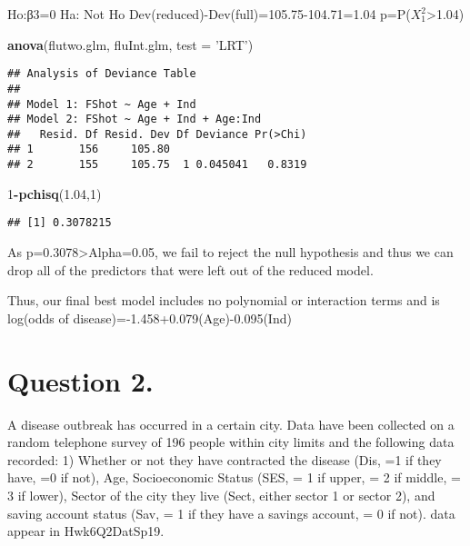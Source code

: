 \documentclass[]{article}
\newenvironment{Shaded}{\begin{snugshade}}{\end{snugshade}}
\newcommand{\KeywordTok}[1]{\textcolor[rgb]{0.13,0.29,0.53}{\textbf{#1}}}
\newcommand{\DataTypeTok}[1]{\textcolor[rgb]{0.13,0.29,0.53}{#1}}
\newcommand{\DecValTok}[1]{\textcolor[rgb]{0.00,0.00,0.81}{#1}}
\newcommand{\FloatTok}[1]{\textcolor[rgb]{0.00,0.00,0.81}{#1}}
\newcommand{\StringTok}[1]{\textcolor[rgb]{0.31,0.60,0.02}{#1}}
\newcommand{\OperatorTok}[1]{\textcolor[rgb]{0.81,0.36,0.00}{\textbf{#1}}}
\newcommand{\NormalTok}[1]{#1}
\begin{document}
Ho:β3=0 Ha: Not Ho Dev(reduced)-Dev(full)=105.75-104.71=1.04
p=P(\(X^2_1\)\textgreater{}1.04)

\begin{Shaded}
\begin{Highlighting}[]
\KeywordTok{anova}\NormalTok{(flutwo.glm, fluInt.glm, }\DataTypeTok{test =} \StringTok{'LRT'}\NormalTok{)}
\end{Highlighting}
\end{Shaded}

\begin{verbatim}
## Analysis of Deviance Table
## 
## Model 1: FShot ~ Age + Ind
## Model 2: FShot ~ Age + Ind + Age:Ind
##   Resid. Df Resid. Dev Df Deviance Pr(>Chi)
## 1       156     105.80                     
## 2       155     105.75  1 0.045041   0.8319
\end{verbatim}

\begin{Shaded}
\begin{Highlighting}[]
\DecValTok{1}\OperatorTok{-}\KeywordTok{pchisq}\NormalTok{(}\FloatTok{1.04}\NormalTok{,}\DecValTok{1}\NormalTok{)}
\end{Highlighting}
\end{Shaded}

\begin{verbatim}
## [1] 0.3078215
\end{verbatim}

As p=0.3078\textgreater{}Alpha=0.05, we fail to reject the null
hypothesis and thus we can drop all of the predictors that were left out
of the reduced model.

Thus, our final best model includes no polynomial or interaction terms
and is log(odds of disease)=-1.458+0.079(Age)-0.095(Ind) \pagebreak

\section{Question 2.}\label{question-2.}

A disease outbreak has occurred in a certain city. Data have been
collected on a random telephone survey of 196 people within city limits
and the following data recorded: 1) Whether or not they have contracted
the disease (Dis, =1 if they have, =0 if not), Age, Socioeconomic Status
(SES, = 1 if upper, = 2 if middle, = 3 if lower), Sector of the city
they live (Sect, either sector 1 or sector 2), and saving account status
(Sav, = 1 if they have a savings account, = 0 if not). data appear in
Hwk6Q2DatSp19.
\end{document}
